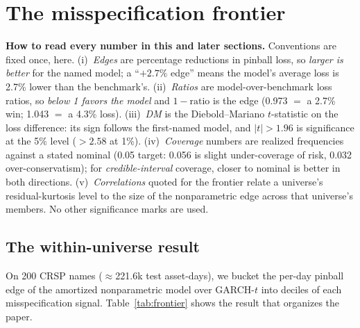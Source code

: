 \documentclass[11pt]{article}
\theoremstyle{remark}
\begin{document}
\section{The misspecification frontier}\label{sec:frontier}

\noindent\textbf{How to read every number in this and later sections.}
Conventions are fixed once, here. (i)~\emph{Edges} are percentage
reductions in pinball loss, so \emph{larger is better} for the named
model; a ``$+2.7\%$ edge'' means the model's average loss is 2.7\%
lower than the benchmark's. (ii)~\emph{Ratios} are model-over-benchmark
loss ratios, so \emph{below 1 favors the model} and $1-\text{ratio}$ is
the edge (0.973 $=$ a 2.7\% win; 1.043 $=$ a 4.3\% loss).
(iii)~\emph{DM} is the Diebold--Mariano $t$-statistic on the loss
difference: its sign follows the first-named model, and $|t| > 1.96$
is significance at the 5\% level ($>2.58$ at 1\%). (iv)~\emph{Coverage}
numbers are realized frequencies against a stated nominal (0.05 target:
0.056 is slight under-coverage of risk, 0.032 over-conservatism); for
\emph{credible-interval} coverage, closer to nominal is better in both
directions. (v)~\emph{Correlations} quoted for the frontier relate a universe's
residual-kurtosis level to the size of the nonparametric edge across
that universe's members. No other significance marks are used.

\subsection{The within-universe result}

On 200 CRSP names ($\approx$221.6k test asset-days), we bucket the per-day
pinball edge of the amortized nonparametric model over GARCH-$t$ into
deciles of each misspecification signal.
Table~\ref{tab:frontier} shows the result that organizes the paper.
\end{document}
